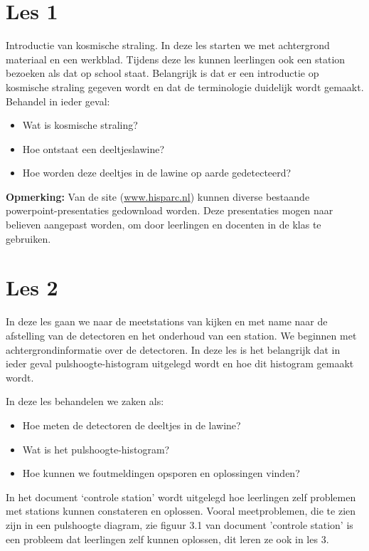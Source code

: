 \section{Les 1}

Introductie van kosmische straling. In deze les starten we met
achtergrond materiaal en een werkblad. Tijdens deze les kunnen
leerlingen ook een station bezoeken als dat op school staat. Belangrijk
is dat er een introductie op kosmische straling gegeven wordt en dat de
terminologie duidelijk wordt gemaakt.
Behandel in ieder geval:

\begin{itemize}
    \item Wat is kosmische straling?
    \item Hoe ontstaat een deeltjeslawine?
    \item Hoe worden deze deeltjes in de lawine op aarde gedetecteerd?
\end{itemize}

\textbf{Opmerking:}
Van de \hisparc site (\url{www.hisparc.nl}) kunnen diverse bestaande powerpoint-presentaties
gedownload worden.
Deze presentaties mogen naar believen aangepast worden, om door leerlingen en docenten
in de klas te gebruiken.


\section{Les 2}

In deze les gaan we naar de meetstations van \hisparc kijken en met name naar de
afstelling van de detectoren en het onderhoud van een station.
We beginnen met achtergrondinformatie over de detectoren. In deze les is het
belangrijk dat in ieder geval pulshoogte-histogram uitgelegd wordt en hoe dit histogram
gemaakt wordt.

In deze les behandelen we zaken als:
\begin{itemize}
    \item Hoe meten de detectoren de deeltjes in de lawine?
    \item Wat is het pulshoogte-histogram?
    \item Hoe kunnen we foutmeldingen opsporen en oplossingen vinden?
\end{itemize}

In het document `controle station' wordt uitgelegd hoe leerlingen zelf
problemen met stations kunnen constateren en oplossen. Vooral meetproblemen, die te zien zijn in een
pulshoogte diagram, zie figuur 3.1 van document 'controle station' is
een probleem dat leerlingen zelf kunnen oplossen, dit leren ze ook in les 3.


